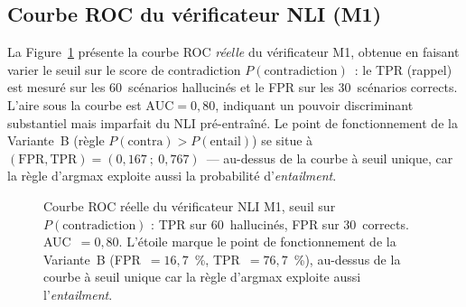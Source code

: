\documentclass[12pt,a4paper]{article}
\begin{document}
\subsection{Courbe ROC du vérificateur NLI (M1)}

La Figure~\ref{fig:roc} présente la courbe ROC \emph{réelle} du vérificateur M1, obtenue en faisant varier le seuil sur le score de contradiction $P(\text{contradiction})$~: le TPR (rappel) est mesuré sur les 60~scénarios hallucinés et le FPR sur les 30~scénarios corrects. L'aire sous la courbe est $\text{AUC}=0{,}80$, indiquant un pouvoir discriminant substantiel mais imparfait du NLI pré-entraîné. Le point de fonctionnement de la Variante~B (règle $P(\text{contra})>P(\text{entail})$) se situe à $(\text{FPR},\text{TPR})=(0{,}167~;~0{,}767)$~--- au-dessus de la courbe à seuil unique, car la règle d'argmax exploite aussi la probabilité d'\textit{entailment}.

\begin{figure}[H]
\centering
{}
\caption{Courbe ROC réelle du vérificateur NLI M1, seuil sur $P(\text{contradiction})$ : TPR sur 60~hallucinés, FPR sur 30~corrects. AUC~$=0{,}80$. L'étoile marque le point de fonctionnement de la Variante~B (FPR~$=16{,}7$~\%, TPR~$=76{,}7$~\%), au-dessus de la courbe à seuil unique car la règle d'argmax exploite aussi l'\textit{entailment}.}
\label{fig:roc}
\end{figure}
\end{document}
